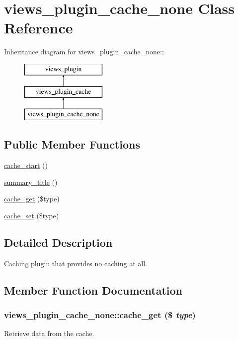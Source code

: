 \hypertarget{classviews__plugin__cache__none}{
\section{views\_\-plugin\_\-cache\_\-none Class Reference}
\label{classviews__plugin__cache__none}
}
Inheritance diagram for views\_\-plugin\_\-cache\_\-none::\begin{figure}[H]
\begin{center}
\leavevmode
\includegraphics[height=3cm]{classviews__plugin__cache__none}
\end{center}
\end{figure}
\subsection*{Public Member Functions}
\begin{DoxyCompactItemize}
\item 
\hyperlink{classviews__plugin__cache__none_a17f65a53d00a8c51865027c3bce8172a}{cache\_\-start} ()
\item 
\hyperlink{classviews__plugin__cache__none_a52838d0e7db62b5e92f837df6a4931b9}{summary\_\-title} ()
\item 
\hyperlink{classviews__plugin__cache__none_a8c0a82cd971ea8abc1045107726a3f1d}{cache\_\-get} (\$type)
\item 
\hyperlink{classviews__plugin__cache__none_a0c66f7c812356a9327ec968c7de6dc47}{cache\_\-set} (\$type)
\end{DoxyCompactItemize}


\subsection{Detailed Description}
Caching plugin that provides no caching at all. 

\subsection{Member Function Documentation}
\hypertarget{classviews__plugin__cache__none_a8c0a82cd971ea8abc1045107726a3f1d}{
\subsubsection[{cache\_\-get}]{\setlength{\rightskip}{0pt plus 5cm}views\_\-plugin\_\-cache\_\-none::cache\_\-get (\$ {\em type})}}
\label{classviews__plugin__cache__none_a8c0a82cd971ea8abc1045107726a3f1d}
Retrieve data from the cache.

